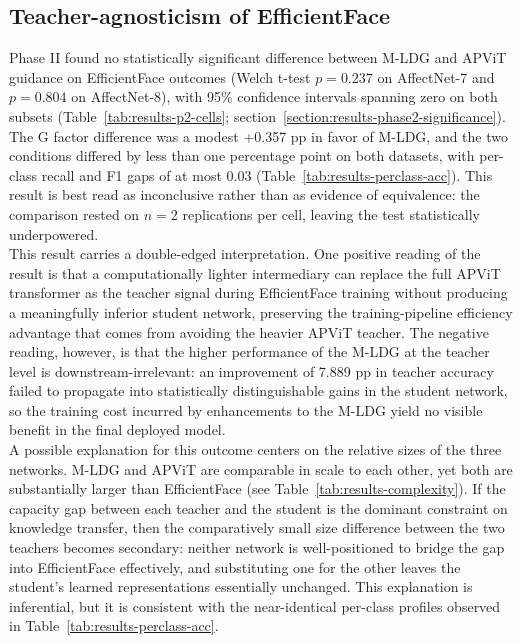 \subsection{Teacher-agnosticism of EfficientFace}
\label{section:discussion-dp3}

Phase II found no statistically significant difference between M-LDG and APViT guidance on EfficientFace outcomes (Welch t-test $p = 0.237$ on AffectNet-7 and $p = 0.804$ on AffectNet-8), with 95\% confidence intervals spanning zero on both subsets (Table~\ref{tab:results-p2-cells}; section~\ref{section:results-phase2-significance}). The G factor difference was a modest +0.357 pp in favor of M-LDG, and the two conditions differed by less than one percentage point on both datasets, with per-class recall and F1 gaps of at most 0.03 (Table~\ref{tab:results-perclass-acc}). This result is best read as inconclusive rather than as evidence of equivalence: the comparison rested on $n = 2$ replications per cell, leaving the test statistically underpowered.\\

This result carries a double-edged interpretation. One positive reading of the result is that a computationally lighter intermediary can replace the full APViT transformer as the teacher signal during EfficientFace training without producing a meaningfully inferior student network, preserving the training-pipeline efficiency advantage that comes from avoiding the heavier APViT teacher. The negative reading, however, is that the higher performance of the M-LDG at the teacher level is downstream-irrelevant: an improvement of 7.889 pp in teacher accuracy failed to propagate into statistically distinguishable gains in the student network, so the training cost incurred by enhancements to the M-LDG yield no visible benefit in the final deployed model.\\

A possible explanation for this outcome centers on the relative sizes of the three networks. M-LDG and APViT are comparable in scale to each other, yet both are substantially larger than EfficientFace (see Table~\ref{tab:results-complexity}). If the capacity gap between each teacher and the student is the dominant constraint on knowledge transfer, then the comparatively small size difference between the two teachers becomes secondary: neither network is well-positioned to bridge the gap into EfficientFace effectively, and substituting one for the other leaves the student's learned representations essentially unchanged. This explanation is inferential, but it is consistent with the near-identical per-class profiles observed in Table~\ref{tab:results-perclass-acc}.

